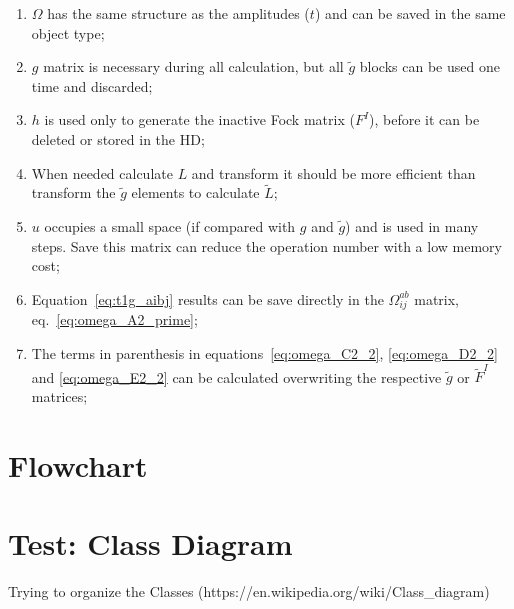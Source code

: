 \begin{enumerate}
\item{}$\Omega$ has the same structure as the amplitudes ($t$) and can be saved in the same object type;
\item{}$g$ matrix is necessary during all calculation, but all $\tilde g$ blocks can be used one time and discarded;
\item{}$h$ is used only to generate the inactive Fock matrix ($F^I$), before it can be deleted or stored in the HD;
\item{}When needed calculate $L$ and transform it should be more efficient than transform the $\tilde g$ elements to calculate $\tilde L$;
\item{}$u$ occupies a small space (if compared with $g$ and $\tilde g$) and is used in many steps. Save this matrix can reduce the operation number with a low memory cost;
\item{}Equation~\ref{eq:t1g_aibj} results can be save directly in the $\Omega_{ij}^{ab}$ matrix, eq.~\ref{eq:omega_A2_prime};
\item{}The terms in parenthesis in equations~\ref{eq:omega_C2_2}, \ref{eq:omega_D2_2} and \ref{eq:omega_E2_2} can be calculated overwriting the respective $\tilde g$ or $\tilde F^I$ matrices;
\end{enumerate}

\newpage
\section{Flowchart}
\label{sec:ccsd_flowchart}



\newpage
\section{Test: Class Diagram}
Trying to organize the Classes (https://en.wikipedia.org/wiki/Class\_diagram)




